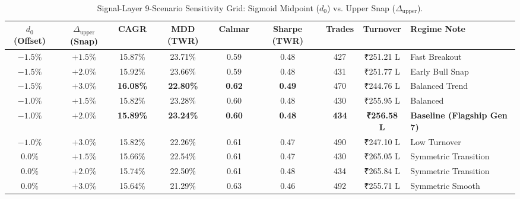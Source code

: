 \documentclass[11pt,a4paper]{article}
\begin{document}
\begin{table}[H]
\centering
\small
\begin{tabularx}{\textwidth}{ccccccccX}
\toprule
\textbf{$d_0$ (Offset)} & \textbf{$\Delta_{\text{upper}}$ (Snap)} & \textbf{CAGR} & \textbf{MDD (TWR)} & \textbf{Calmar} & \textbf{Sharpe (TWR)} & \textbf{Trades} & \textbf{Turnover} & \textbf{Regime Note} \\
\midrule
$-1.5\%$ & $+1.5\%$ & 15.87\% & 23.71\% & 0.59 & 0.48 & 427 & ₹251.21 L & Fast Breakout \\
$-1.5\%$ & $+2.0\%$ & 15.92\% & 23.66\% & 0.59 & 0.48 & 431 & ₹251.77 L & Early Bull Snap \\
$-1.5\%$ & $+3.0\%$ & \textbf{16.08\%} & \textbf{22.80\%} & \textbf{0.62} & \textbf{0.49} & 470 & ₹244.76 L & Balanced Trend \\
\midrule
$-1.0\%$ & $+1.5\%$ & 15.82\% & 23.28\% & 0.60 & 0.48 & 430 & ₹255.95 L & Balanced \\
$-1.0\%$ & $+2.0\%$ & \textbf{15.89\%} & \textbf{23.24\%} & \textbf{0.60} & \textbf{0.48} & \textbf{434} & \textbf{₹256.58 L} & \textbf{Baseline (Flagship Gen 7)} \\
$-1.0\%$ & $+3.0\%$ & 15.82\% & 22.26\% & 0.61 & 0.47 & 490 & ₹247.10 L & Low Turnover \\
\midrule
$0.0\%$ & $+1.5\%$ & 15.66\% & 22.54\% & 0.61 & 0.47 & 430 & ₹265.05 L & Symmetric Transition \\
$0.0\%$ & $+2.0\%$ & 15.74\% & 22.50\% & 0.61 & 0.48 & 434 & ₹265.84 L & Symmetric Transition \\
$0.0\%$ & $+3.0\%$ & 15.64\% & 21.29\% & 0.63 & 0.46 & 492 & ₹255.71 L & Symmetric Smooth \\
\bottomrule
\end{tabularx}
\caption{Signal-Layer 9-Scenario Sensitivity Grid: Sigmoid Midpoint ($d_0$) vs. Upper Snap ($\Delta_{\text{upper}}$).}
\end{table}
\end{document}
